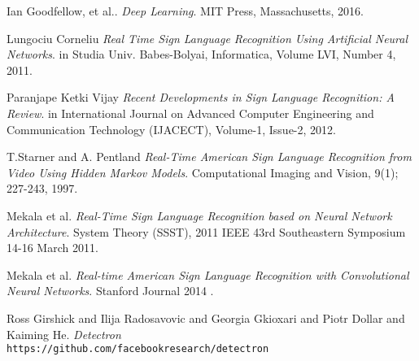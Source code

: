 \label{CapFT}

\begin{thebibliography}{9}
Ian Goodfellow, et al.. 
\textit{Deep Learning}. 
MIT Press, Massachusetts, 2016.
 
Lungociu Corneliu
\textit{Real Time Sign Language Recognition Using Artificial Neural Networks}.
in Studia Univ. Babes-Bolyai, Informatica, Volume LVI, Number 4, 2011. 

Paranjape Ketki Vijay
\textit{Recent Developments in Sign Language Recognition: A Review}.
in International Journal on Advanced Computer Engineering and Communication Technology (IJACECT), Volume-1, Issue-2, 2012. 

T.Starner and A. Pentland
\textit{Real-Time American Sign Language Recognition from Video Using Hidden Markov Models}.
Computational Imaging and Vision, 9(1); 227-243, 1997.

Mekala et al.
\textit{Real-Time Sign Language Recognition based on Neural Network Architecture}.
System Theory (SSST), 2011 IEEE 43rd Southeastern Symposium 14-16 March 2011. 

Mekala et al.
\textit{Real-time American Sign Language Recognition with Convolutional Neural
Networks}.
Stanford Journal 2014
. 

Ross Girshick and Ilija Radosavovic and Georgia Gkioxari and Piotr Dollar and Kaiming He.
\textit{Detectron}
\\\texttt{https://github.com/facebookresearch/detectron}
\end{thebibliography}
